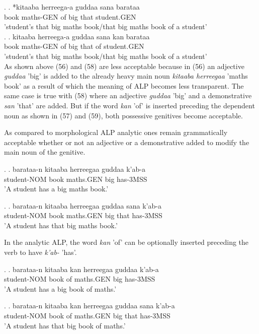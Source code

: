 \documentclass[11pt,a4paper]{article}
\begin{document}
	\ex.
	\ag.
	*kitaaba herreega-a guddaa sana barataa\\
	book maths-GEN of big that student.GEN\\
	'student's that big maths book/that big maths book of a student'\\
	
	\ex.
	\ag.
	kitaaba herreega-a guddaa sana kan barataa\\
	book maths-GEN of big that of student.GEN\\
	'student's that big maths book/that big maths book of a student'\\
	
	As shown above (56) and (58) are less acceptable because in (56) an adjective \emph{guddaa} 'big' is added to the already heavy main noun \emph{kitaaba herreegaa} 'maths book' as a result of which the meaning of ALP becomes less transparent. The same case is true with (58) where an adjective \emph{guddaa} 'big' and a demonstrative \emph{san} 'that' are added. But if the word \emph{kan} 'of' is inserted preceding the dependent noun as shown in (57) and (59), both possessive genitives become acceptable. 
	
	As compared to morphological ALP analytic ones remain grammatically acceptable whether or not an adjective or a demonstrative added to modify the main noun of the genitive.
	
	\ex.
	\ag.
	barataa-n kitaaba herreegaa guddaa k'ab-a\\
	student-NOM book maths.GEN big has-3MSS\\
	'A student has a big maths book.'
	
	\ex.
	\ag.
	barataa-n kitaaba herreegaa guddaa sana k'ab-a\\
	student-NOM book maths.GEN big that has-3MSS\\
	'A student has that big maths book.'
	
	In the analytic ALP, the word \emph{kan} 'of' can be optionally inserted preceding the verb to have \emph{k'ab-} 'has'.
	
	\ex.
	\ag.
	barataa-n kitaaba kan herreegaa guddaa k'ab-a\\
	student-NOM book of maths.GEN big has-3MSS\\
	'A student has a big book of maths.'
	
	\ex.
	\ag.
	barataa-n kitaaba kan herreegaa guddaa sana k'ab-a\\
	student-NOM book of maths.GEN big that has-3MSS\\
	'A student has that big book of maths.'
	
\end{document}
